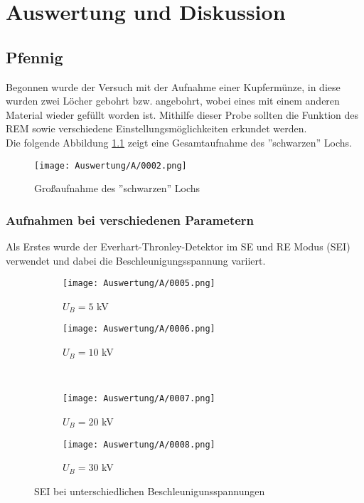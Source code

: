 
\chapter{Auswertung und Diskussion}
\label{chap:versuchsauswertung}

\section{Pfennig}
Begonnen wurde der Versuch mit der Aufnahme einer Kupfermünze, in diese wurden zwei Löcher gebohrt bzw. angebohrt, wobei eines mit einem anderen Material wieder gefüllt worden ist. Mithilfe dieser Probe sollten die Funktion des REM sowie verschiedene Einstellungsmöglichkeiten erkundet werden.\\
Die folgende Abbildung \ref{fig:GsL} zeigt eine Gesamtaufnahme des ''schwarzen'' Lochs.

\begin{figure}[h]
    \centering
    \texttt{[image: Auswertung/A/0002.png]}
    \caption{Großaufnahme des ''schwarzen'' Lochs}
    \label{fig:GsL}
\end{figure}

\newpage
\subsection*{Aufnahmen bei verschiedenen Parametern}
\label{subsec:Bs}
Als Erstes wurde der Everhart-Thronley-Detektor im SE und RE Modus (SEI) verwendet und dabei die Beschleunigungsspannung variiert.

\begin{figure}[h]
    \centering
    
    \begin{subfigure}[b]{0.45\textwidth}
        \centering
        \texttt{[image: Auswertung/A/0005.png]}
        \caption{$U_B = 5$ kV}
    \end{subfigure}
    \hfill
    \begin{subfigure}[b]{0.45\textwidth}
        \centering
        \texttt{[image: Auswertung/A/0006.png]}
        \caption{$U_B = 10$ kV}
    \end{subfigure}
    \\
    \begin{subfigure}[b]{0.45\textwidth}
        \centering
        \texttt{[image: Auswertung/A/0007.png]}
        \caption{$U_B = 20$ kV}
    \end{subfigure}
    \hfill
    \begin{subfigure}[b]{0.45\textwidth}
        \centering
        \texttt{[image: Auswertung/A/0008.png]}
        \caption{$U_B = 30$ kV}
    \end{subfigure}
    \caption{SEI bei unterschiedlichen Beschleunigunsspannungen}
\end{figure}

